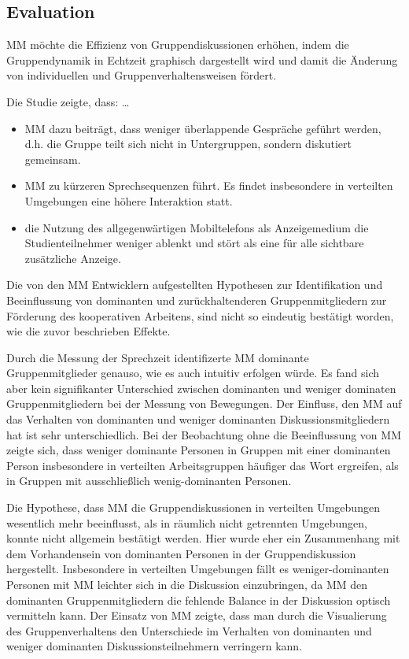\subsection{Evaluation}
MM möchte die Effizienz von Gruppendiskussionen erhöhen, indem die
Gruppendynamik in Echtzeit graphisch dargestellt wird und damit die Änderung von 
 individuellen und Gruppenverhaltensweisen fördert.
 
Die Studie zeigte, dass:
\dots
\begin{itemize}
  \item MM dazu beiträgt, dass weniger überlappende Gespräche geführt werden, d.h. die
Gruppe teilt sich nicht in Untergruppen, sondern diskutiert gemeinsam.
  \item MM zu kürzeren Sprechsequenzen führt. Es findet insbesondere in verteilten
Umgebungen eine höhere Interaktion statt.
  \item die Nutzung des allgegenwärtigen Mobiltelefons als Anzeigemedium die
Studienteilnehmer weniger ablenkt und stört als eine für alle sichtbare
zusätzliche Anzeige.

\end{itemize}

Die von den MM Entwicklern aufgestellten Hypothesen zur Identifikation und
Beeinflussung von dominanten und zurückhaltenderen Gruppenmitgliedern zur
Förderung des kooperativen Arbeitens, sind nicht so eindeutig bestätigt worden,
wie die zuvor beschrieben Effekte.

Durch die Messung der Sprechzeit identifizerte MM dominante Gruppenmitglieder
genauso, wie es auch intuitiv erfolgen würde. Es fand sich aber kein
signifikanter Unterschied zwischen dominanten und weniger dominaten
Gruppenmitgliedern bei der Messung von Bewegungen.
Der Einfluss, den MM auf das Verhalten von dominanten und weniger dominanten
Diskussionsmitgliedern hat ist sehr unterschiedlich.
Bei der Beobachtung ohne die Beeinflussung von MM zeigte sich, dass weniger
dominante Personen in Gruppen mit einer dominanten Person insbesondere in
verteilten Arbeitsgruppen häufiger das Wort ergreifen, als in Gruppen mit
ausschließlich wenig-dominanten Personen.

Die Hypothese, dass MM die Gruppendiskussionen in verteilten Umgebungen
wesentlich mehr beeinflusst, als in räumlich nicht getrennten Umgebungen, konnte
nicht allgemein bestätigt werden. Hier wurde eher ein Zusammenhang mit dem
Vorhandensein von dominanten Personen in der Gruppendiskussion hergestellt.
Insbesondere in verteilten Umgebungen fällt es weniger-dominanten Personen mit
MM leichter sich in die Diskussion einzubringen, da MM den dominanten
Gruppenmitgliedern die fehlende Balance in der Diskussion optisch vermitteln
kann. 
Der Einsatz von MM zeigte, dass man durch die Visualierung des Gruppenverhaltens
den Unterschiede im Verhalten von dominanten und weniger dominanten
Diskussionsteilnehmern verringern kann.


